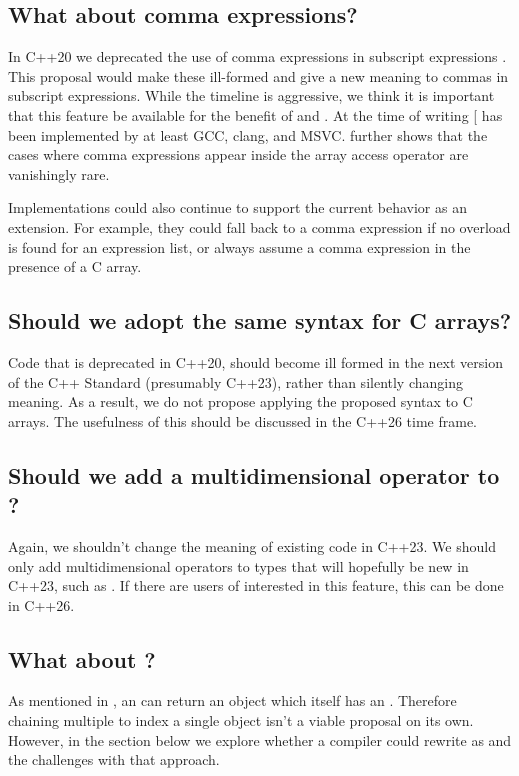 \documentclass{wg21}
\begin{document}
\subsection{What about comma expressions?}

In C++20 we deprecated the use of comma expressions in subscript expressions .
This proposal would make these ill-formed and give a new meaning to commas in subscript expressions.
While the timeline is aggressive, we think it is important that this feature be available for the benefit of \tcode{
} and .
At the time of writing [ has been implemented by at least GCC, clang, and MSVC.
 further shows that the cases where comma expressions appear inside the array access operator are vanishingly rare.

Implementations could also continue to support the current behavior as an extension.  For example, they could fall back to a comma expression if no overload is found for an expression list, or always assume a comma expression in the presence of a C array.

\subsection{Should we adopt the same syntax for C arrays?}

Code that is deprecated in C++20, should become ill formed in the next version of the C++ Standard (presumably C++23),
rather than silently changing meaning.
As a result, we do not propose applying the proposed syntax to C arrays.
The usefulness of this should be discussed in the C++26 time frame.

\subsection{Should we add a multidimensional operator to ?}

Again, we shouldn't change the meaning of existing code in C++23.
We should only add multidimensional operators to types that will hopefully be new in C++23, such as .
If there are users of  interested in this feature, this can be done in C++26.

\subsection{What about \tcode{[foo][bar]}?}

As mentioned in , an  can return an object which itself has an .
Therefore chaining multiple \tcode{[]} to index a single object isn't a viable proposal on its own.
However, in the section below we explore whether a compiler could rewrite  as 
and the challenges with that approach.
\end{document}
